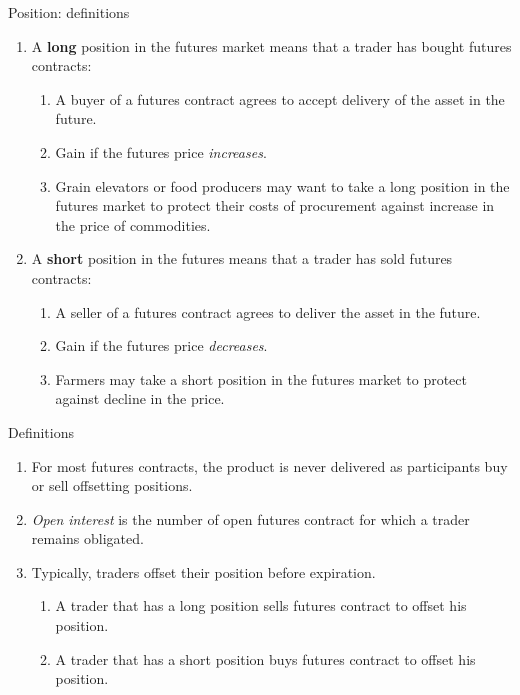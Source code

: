 \documentclass[table,xcolor=pdftex,dvipsnames]{beamer}\usepackage[]{graphicx}\usepackage[]{color}
\begin{document}
\begin{frame}{Position: definitions}
\begin{enumerate}[label=\textbullet]
       \item A \textbf{long} position in the futures market means that a trader has bought futures contracts:
       \begin{enumerate}[label=-]
          \item A buyer of a futures contract agrees to accept delivery of the asset in the future.
          \item Gain if the futures price \emph{increases}.
          \item Grain elevators or food producers may want to take a long position in the futures market to protect their costs of procurement against increase in the price of commodities.
       \end{enumerate}
      \item A \textbf{short} position in the futures means that a trader has sold futures contracts:
      \begin{enumerate}[label=-]
          \item A seller of a futures contract agrees to deliver the asset in the future.
          \item Gain if the futures price \emph{decreases}.
          \item Farmers may take a short position in the futures market to protect against decline in the price.
       \end{enumerate}
\end{enumerate}
\end{frame}


\begin{frame}{Definitions}
\begin{enumerate}[label=\textbullet]
      \item For most futures contracts, the product is never delivered as participants buy or sell offsetting positions.
      \item \emph{Open interest} is the number of open futures contract for which a trader remains obligated.
      \item Typically, traders offset their position before expiration.
        \begin{enumerate}[label=-]
          \item A trader that has a long position sells futures contract to offset his position.
          \item A trader that has a short position buys futures contract to offset his position.
        \end{enumerate}
\end{enumerate}
\end{frame}
\end{document}
